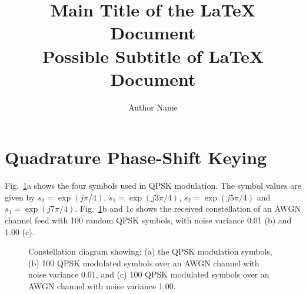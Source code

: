 \documentclass[titlepage]{article}
\author{Author Name}
\title{
    Main Title of the \LaTeX{} Document
    \\ \small \textbf{
        Possible Subtitle of \LaTeX{} Document
    }
}
\begin{document}
\maketitle

\section{Quadrature Phase-Shift Keying}
Fig.~\ref{fig:qpsk_constellation}a shows the four symbols used in QPSK modulation. The symbol values are given by 
$s_0 = \exp{(j\pi/4)}$, $s_1 = \exp{(j3\pi/4)}$, $s_2 = \exp{(j5\pi/4)}$ and $s_3 = \exp{(j7\pi/4)}$.
Fig.~\ref{fig:qpsk_constellation}b and 1c shows the received constellation of an AWGN channel feed with 100 random
QPSK symbols, with noise variance 0.01 (b) and 1.00 (c).

\begin{figure}
    \centering
    \caption{
        Constellation diagram showing: 
        (a) the QPSK modulation symbols,
        (b) 100 QPSK modulated symbols over an AWGN channel with noise variance 0.01, and
        (c) 100 QPSK modulated symbols over an AWGN channel with noise variance 1.00.
    }
    \label{fig:qpsk_constellation}
\end{figure}

%
%


\end{document}
